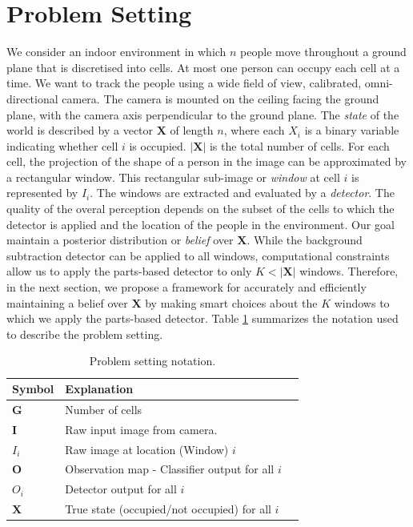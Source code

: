 \documentclass[10pt,twocolumn,letterpaper]{article}
\begin{document}
\section{Problem Setting}
We consider an indoor environment in which $ n$ people move throughout a ground plane that is discretised into cells. At most one person can occupy each cell at a time. We want to track the people using a wide field of view, calibrated, omni-directional camera. The camera is mounted on the ceiling facing the ground plane, with the camera axis perpendicular to the ground plane.
The \emph{state} of the world is described by a vector $\mathbf{X}$ of length $n$, where each $X_i$ is a binary variable indicating whether cell $i$ is occupied. $|\mathbf{X}| $ is the total number of cells.
For each cell, the projection of the shape of a person in the image can be approximated by a rectangular window. This rectangular sub-image or \emph{window} at cell $ i $ is represented by $ I_{i} $. The windows are extracted and evaluated by a \emph{detector}. The quality of the overal perception depends on the subset of the cells to which the detector is applied and the location of the people in the environment.
Our goal maintain a posterior distribution or \emph{belief} over $\mathbf{X}$. While the background subtraction detector can be applied to all windows, computational constraints allow us to apply the parts-based detector to only $K < |\mathbf{X}|$ windows. Therefore, in the next section, we propose a framework for accurately and efficiently maintaining a belief over $\mathbf{X}$ by making smart choices about the $K$ windows to which we apply the parts-based detector. Table \ref{tab:Formal symbols} summarizes the notation used to describe the problem setting.
\begin{table}[ht]
\begin{tabular}{lll}
\hline
Symbol & Explanation \\
\hline
$\textbf{G} $ & Number of cells\\
$ \textbf{I} $ & Raw input image from camera.\\
$ I_{i} $ & Raw image at location (Window) $ i$\\
$ \textbf{O} $ & Observation map - Classifier output for all $ i $\\
$O_{i} $& Detector output for all $ i $\\
$\textbf{X}$& True state (occupied/not occupied) for all $i$\\
\hline
\end{tabular}
\caption{%
Problem setting notation. 
}
\label{tab:Formal symbols}
\end{table}
\end{document}
